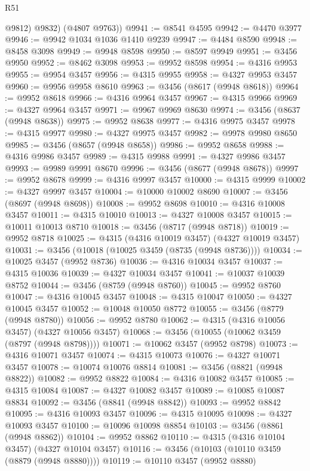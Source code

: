 \begin{lexlean}{R51}
\begin{coremodule}
          @9812)
        @9832)
      (@4807 @9763))
@9941 := @8541 @4595
@9942 := @4470 @3977
@9946 := @9942 @1034 @1036 @1410 @9239
@9947 := @4484 @8590
@9948 := @8458 @3098
@9949 := @9948 @8598
@9950 := @8597 @9949
@9951 := @3456 @9950
@9952 := @8462 @3098
@9953 := @9952 @8598
@9954 := @4316 @9953
@9955 := @9954 @3457
@9956 := @4315 @9955
@9958 := @4327 @9953 @3457
@9960 := @9956 @9958 @8610
@9963 := @3456 (@8617 (@9948 @8618))
@9964 := @9952 @8618
@9966 := @4316 @9964 @3457
@9967 := @4315 @9966
@9969 := @4327 @9964 @3457
@9971 := @9967 @9969 @8630
@9974 := @3456 (@8637 (@9948 @8638))
@9975 := @9952 @8638
@9977 := @4316 @9975 @3457
@9978 := @4315 @9977
@9980 := @4327 @9975 @3457
@9982 := @9978 @9980 @8650
@9985 := @3456 (@8657 (@9948 @8658))
@9986 := @9952 @8658
@9988 := @4316 @9986 @3457
@9989 := @4315 @9988
@9991 := @4327 @9986 @3457
@9993 := @9989 @9991 @8670
@9996 := @3456 (@8677 (@9948 @8678))
@9997 := @9952 @8678
@9999 := @4316 @9997 @3457
@10000 := @4315 @9999
@10002 := @4327 @9997 @3457
@10004 := @10000 @10002 @8690
@10007 := @3456 (@8697 (@9948 @8698))
@10008 := @9952 @8698
@10010 := @4316 @10008 @3457
@10011 := @4315 @10010
@10013 := @4327 @10008 @3457
@10015 := @10011 @10013 @8710
@10018 := @3456 (@8717 (@9948 @8718))
@10019 := @9952 @8718
@10025 := @4315 (@4316 @10019 @3457) (@4327 @10019 @3457)
@10031 := @3456 (@10018 (@10025 @3459 (@8735 (@9948 @8736))))
@10034 := @10025 @3457 (@9952 @8736)
@10036 := @4316 @10034 @3457
@10037 := @4315 @10036
@10039 := @4327 @10034 @3457
@10041 := @10037 @10039 @8752
@10044 := @3456 (@8759 (@9948 @8760))
@10045 := @9952 @8760
@10047 := @4316 @10045 @3457
@10048 := @4315 @10047
@10050 := @4327 @10045 @3457
@10052 := @10048 @10050 @8772
@10055 := @3456 (@8779 (@9948 @8780))
@10056 := @9952 @8780
@10062 := @4315 (@4316 @10056 @3457) (@4327 @10056 @3457)
@10068 := @3456 (@10055 (@10062 @3459 (@8797 (@9948 @8798))))
@10071 := @10062 @3457 (@9952 @8798)
@10073 := @4316 @10071 @3457
@10074 := @4315 @10073
@10076 := @4327 @10071 @3457
@10078 := @10074 @10076 @8814
@10081 := @3456 (@8821 (@9948 @8822))
@10082 := @9952 @8822
@10084 := @4316 @10082 @3457
@10085 := @4315 @10084
@10087 := @4327 @10082 @3457
@10089 := @10085 @10087 @8834
@10092 := @3456 (@8841 (@9948 @8842))
@10093 := @9952 @8842
@10095 := @4316 @10093 @3457
@10096 := @4315 @10095
@10098 := @4327 @10093 @3457
@10100 := @10096 @10098 @8854
@10103 := @3456 (@8861 (@9948 @8862))
@10104 := @9952 @8862
@10110 := @4315 (@4316 @10104 @3457) (@4327 @10104 @3457)
@10116 := @3456 (@10103 (@10110 @3459 (@8879 (@9948 @8880))))
@10119 := @10110 @3457 (@9952 @8880)

\end{coremodule}
\end{lexlean}
